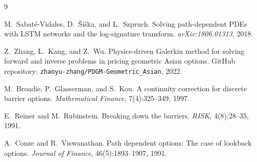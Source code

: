 \documentclass[12pt,a4paper]{article}
\begin{document}
\begin{thebibliography}{9}

M.~Sabat\'e-Vidales, D.~{\v S}i{\v s}ka, and L.~Szpruch.
\newblock Solving path-dependent PDEs with LSTM networks and the log-signature
  transform.
\newblock \emph{arXiv:1806.01313}, 2018.

Z.~Zhang, L.~Kang, and Z.~Wu.
\newblock Physics-driven Galerkin method for solving forward and inverse
  problems in pricing geometric Asian options.
\newblock GitHub repository: \texttt{zhaoyu-zhang/PDGM-Geometric\_Asian}, 2022.

M.~Broadie, P.~Glasserman, and S.~Kou.
\newblock A continuity correction for discrete barrier options.
\newblock \emph{Mathematical Finance}, 7(4):325--349, 1997.

E.~Reiner and M.~Rubinstein.
\newblock Breaking down the barriers.
\newblock \emph{RISK}, 4(8):28--35, 1991.

A.~Conze and R.~Viswanathan.
\newblock Path dependent options: The case of lookback options.
\newblock \emph{Journal of Finance}, 46(5):1893--1907, 1991.

\end{thebibliography}
\end{document}
